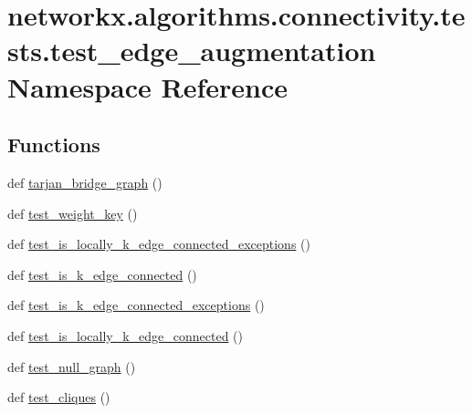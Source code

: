 \hypertarget{namespacenetworkx_1_1algorithms_1_1connectivity_1_1tests_1_1test__edge__augmentation}{}\section{networkx.\+algorithms.\+connectivity.\+tests.\+test\+\_\+edge\+\_\+augmentation Namespace Reference}
\label{namespacenetworkx_1_1algorithms_1_1connectivity_1_1tests_1_1test__edge__augmentation}
\subsection*{Functions}
\begin{DoxyCompactItemize}
\item 
def \hyperlink{namespacenetworkx_1_1algorithms_1_1connectivity_1_1tests_1_1test__edge__augmentation_aebc5518b85a232317b999424b4f793db}{tarjan\+\_\+bridge\+\_\+graph} ()
\item 
def \hyperlink{namespacenetworkx_1_1algorithms_1_1connectivity_1_1tests_1_1test__edge__augmentation_a09f6213417602529549283618e198f75}{test\+\_\+weight\+\_\+key} ()
\item 
def \hyperlink{namespacenetworkx_1_1algorithms_1_1connectivity_1_1tests_1_1test__edge__augmentation_a52a68ad0705e8f84a858fd7736fb9b13}{test\+\_\+is\+\_\+locally\+\_\+k\+\_\+edge\+\_\+connected\+\_\+exceptions} ()
\item 
def \hyperlink{namespacenetworkx_1_1algorithms_1_1connectivity_1_1tests_1_1test__edge__augmentation_ad1cade62f30484319e1e160fff25fb75}{test\+\_\+is\+\_\+k\+\_\+edge\+\_\+connected} ()
\item 
def \hyperlink{namespacenetworkx_1_1algorithms_1_1connectivity_1_1tests_1_1test__edge__augmentation_a7fa934f05865f0dacbbadb587148f270}{test\+\_\+is\+\_\+k\+\_\+edge\+\_\+connected\+\_\+exceptions} ()
\item 
def \hyperlink{namespacenetworkx_1_1algorithms_1_1connectivity_1_1tests_1_1test__edge__augmentation_af26b34932b3665923092291e33e6a4a2}{test\+\_\+is\+\_\+locally\+\_\+k\+\_\+edge\+\_\+connected} ()
\item 
def \hyperlink{namespacenetworkx_1_1algorithms_1_1connectivity_1_1tests_1_1test__edge__augmentation_a75a97835cf173b742ca8e0798e533ac7}{test\+\_\+null\+\_\+graph} ()
\item 
def \hyperlink{namespacenetworkx_1_1algorithms_1_1connectivity_1_1tests_1_1test__edge__augmentation_a25e61f71a112a5ea21ad4642010ff7f6}{test\+\_\+cliques} ()

\end{DoxyCompactItemize}
